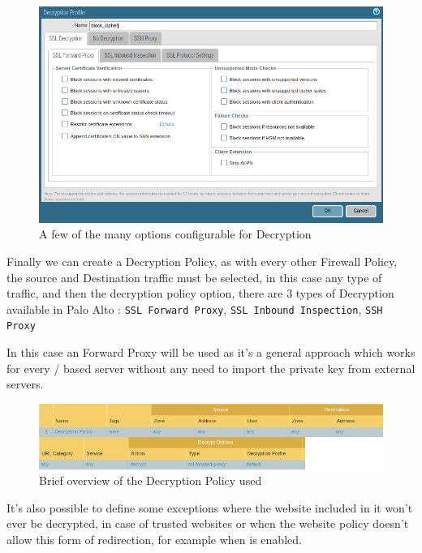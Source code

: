 \begin{figure}[!hb]
    \centering
     \includegraphics[width=13cm]{img/decryption_options.png}
    	\caption{A few of the many options configurable for Decryption}\label{Decryption Options}
\end{figure}

\newpage

Finally we can create a Decryption Policy, as with every other Firewall Policy, the source and Destination traffic must be selected, in this case any type of traffic, and then the decryption policy option, there are 3 types of Decryption available in Palo Alto : \verb|SSL Forward Proxy|, \verb|SSL Inbound Inspection|, \verb|SSH Proxy|

In this case an  Forward Proxy will be used as it's a general approach which works for every / based server without any need to import the private key from external servers.

\begin{figure}[!hb]
\centering
 \includegraphics[width=13cm]{img/decryption_policy.png}
	\caption{Brief overview of the Decryption Policy used}\label{Decryption Policy}
\end{figure}

It's also possible to define some exceptions where the website included in it won't ever be decrypted, in case of trusted websites or when the website policy doesn't allow this form of redirection, for example when \cite{hsts} is enabled.

